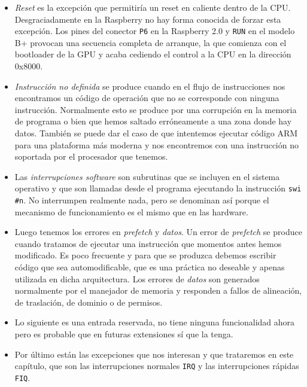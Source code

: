 \begin{itemize}
  \item {\it Reset} es la excepción que permitiría un reset en caliente dentro de la CPU.
Desgraciadamente en la Raspberry no hay forma conocida de forzar esta excepción. Los pines
del conector {\tt P6} en la Raspberry 2.0 y {\tt RUN} en el modelo B+ provocan una secuencia
completa de arranque, la que comienza con el bootloader de la GPU y acaba cediendo el control
a la CPU en la dirección 0x8000.

  \item {\it Instrucción no definida} se produce cuando en el flujo de instrucciones nos encontramos
un código de operación que no se corresponde con ninguna instrucción. Normalmente esto se
produce por una corrupción en la memoria de programa o bien que hemos saltado erróneamente
a una zona donde hay datos. También se puede dar el caso de que intentemos ejecutar código
ARM para una plataforma más moderna y nos encontremos con una instrucción no soportada por el
procesador que tenemos.

  \item Las {\it interrupciones software} son subrutinas que se incluyen en el
sistema operativo y que son llamadas desde el programa ejecutando la
instrucción {\tt swi \#n}. No interrumpen realmente nada, pero se
denominan así porque el mecanismo de funcionamiento es el mismo que en
las hardware.

  \item Luego tenemos los errores en {\it prefetch} y {\it datos}. Un error de {\it prefetch} se produce
cuando tratamos de ejecutar una instrucción que momentos antes hemos modificado. Es poco
frecuente y para que se produzca debemos escribir código que sea automodificable, que es
una práctica no deseable y apenas utilizada en dicha arquitectura. Los errores de {\it datos}
son generados normalmente por el manejador de memoria y responden a fallos de alineación, de
traslación, de dominio o de permisos.

  \item Lo siguiente es una entrada reservada, no tiene ninguna funcionalidad ahora
pero es probable que en futuras extensiones sí que la tenga.

  \item Por último están las excepciones que nos interesan y que trataremos en este capítulo, que son
las interrupciones normales {\tt IRQ} y las interrupciones rápidas {\tt FIQ}.
\end{itemize}

